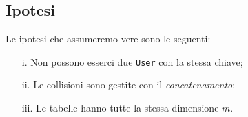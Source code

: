 \subsection{Ipotesi}
Le ipotesi che assumeremo vere sono le seguenti:
\begin{enumerate}
    \item[i.] Non possono esserci due \verb|User| con la stessa chiave;
    \item[ii.] Le collisioni sono gestite con il \textit{concatenamento};
    \item[iii.] Le tabelle hanno tutte la stessa dimensione $m$.
\end{enumerate}



\begin{comment}
    \lstset{
      basicstyle=\footnotesize,
      xleftmargin=.3\textwidth, xrightmargin=.2\textwidth
    }
    \begin{lstlisting}
        insert(T,100,"Greco")
    \end{lstlisting}
    
    Abbiamo poi ottenuto il seguente grafico che mostra...
    
    \begin{figure}[htb]
    \begin{center}
    \texttt{[image: src/img/graph1.pdf]}
    \caption{This is a figure.}
    \end{center}
    \end{figure}
\end{comment}
